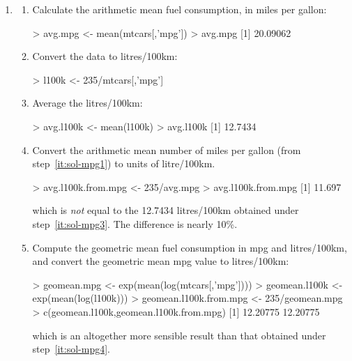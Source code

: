 \begin{enumerate}
\item
  \begin{enumerate}
  \item\label{it:sol-mpg1} Calculate the arithmetic mean fuel
    consumption, in miles per gallon:

\begin{console}
> avg.mpg <- mean(mtcars[,'mpg'])
> avg.mpg
[1] 20.09062
\end{console}

\item\label{it:sol-mpg2} Convert the data to litres/100km:

\begin{console}
> l100k <- 235/mtcars[,'mpg']
\end{console}

\item\label{it:sol-mpg3} Average the litres/100km:

\begin{console}
> avg.l100k <- mean(l100k)
> avg.l100k
[1] 12.7434
\end{console}

\item\label{it:sol-mpg4} Convert the arithmetic mean number of miles
  per gallon (from step~\ref{it:sol-mpg1}) to units of litre/100km.

\begin{console}
> avg.l100k.from.mpg <- 235/avg.mpg
> avg.l100k.from.mpg
[1] 11.697
\end{console}

\noindent which is \emph{not} equal to the 12.7434 litres/100km
obtained under step~\ref{it:sol-mpg3}. The difference is nearly 10\%.

\item\label{it:sol-mpg5} Compute the geometric mean fuel consumption
  in mpg and litres/100km, and convert the geometric mean mpg value to
  litres/100km:
  
\begin{console}
> geomean.mpg <- exp(mean(log(mtcars[,'mpg'])))
> geomean.l100k <- exp(mean(log(l100k)))
> geomean.l100k.from.mpg <- 235/geomean.mpg
> c(geomean.l100k,geomean.l100k.from.mpg)
[1] 12.20775 12.20775
\end{console}

\noindent which is an altogether more sensible result than that
obtained under step~\ref{it:sol-mpg4}.

\end{enumerate}


\end{enumerate}
